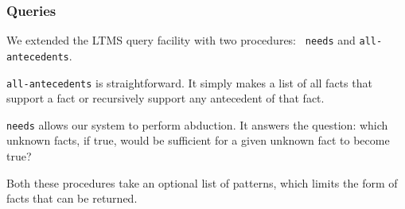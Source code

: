 \subsubsection{Queries}

We extended the LTMS query facility with two procedures: {\small\tt
needs} and {\small\tt all-antecedents}. 

{\small\tt all-antecedents} is straightforward. It simply makes a list
of all facts that support a fact or recursively support any antecedent
of that fact.

{\small\tt needs} allows our system to perform abduction. It answers
the question: which unknown facts, if true, would be sufficient for a
given unknown fact to become true?

Both these procedures take an optional list of patterns, which limits
the form of facts that can be returned.
